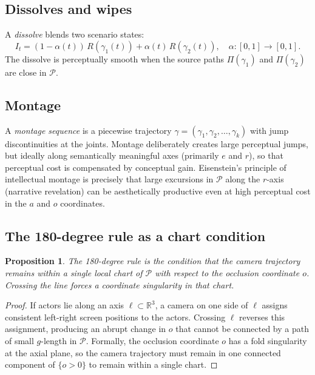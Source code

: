 \documentclass[12pt,a4paper]{article}
\theoremstyle{plain}
\newtheorem{proposition}[theorem]{Proposition}
\theoremstyle{definition}
\begin{document}
\subsection{Dissolves and wipes}

A \emph{dissolve} blends two scenario states:
\[
I_t = (1-\alpha(t))\,R(\gamma_1(t)) + \alpha(t)\,R(\gamma_2(t)),
\quad \alpha:[0,1]\to[0,1].
\]
The dissolve is perceptually smooth when the source paths
$\Pi(\gamma_1)$ and $\Pi(\gamma_2)$ are close in $\mathcal{P}$.

\subsection{Montage}

A \emph{montage sequence} is a piecewise trajectory
$\gamma = (\gamma_1,\gamma_2,\dots,\gamma_k)$
with jump discontinuities at the joints. Montage deliberately creates large
perceptual jumps, but ideally along semantically meaningful axes (primarily
$e$ and $r$), so that perceptual cost is compensated by conceptual gain.
Eisenstein's principle of intellectual montage is precisely that large excursions
in $\mathcal{P}$ along the $r$-axis (narrative revelation) can be aesthetically
productive even at high perceptual cost in the $a$ and $o$ coordinates.

\subsection{The 180-degree rule as a chart condition}

\begin{proposition}
\label{prop:180}
The 180-degree rule is the condition that the camera trajectory remains within
a single local chart of $\mathcal{P}$ with respect to the occlusion coordinate
$o$. Crossing the line forces a coordinate singularity in that chart.
\end{proposition}

\begin{proof}
If actors lie along an axis $\ell\subset\mathbb{R}^3$, a camera on one side
of $\ell$ assigns consistent left-right screen positions to the actors.
Crossing $\ell$ reverses this assignment, producing an abrupt change in $o$
that cannot be connected by a path of small $g$-length in $\mathcal{P}$.
Formally, the occlusion coordinate $o$ has a fold singularity at the axial
plane, so the camera trajectory must remain in one connected component of
$\{o>0\}$ to remain within a single chart.
\end{proof}
\end{document}
